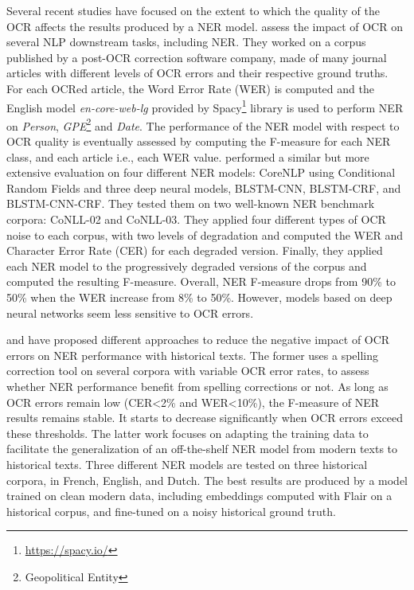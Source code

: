 Several recent studies have focused on the extent to which the quality of the OCR affects the results produced by a NER model.
\cite{van2020assessing} assess the impact of OCR on several NLP downstream tasks, including NER. They worked on a corpus published by a post-OCR correction software company, made of many journal articles with different levels of OCR errors and their respective ground truths.
For each OCRed article, the Word Error Rate (WER) is computed and the English model \textit{en-core-web-lg} provided by Spacy\footnote{\url{https://spacy.io/}} library is used to perform NER on \textit{Person}, \textit{GPE}\footnote{Geopolitical Entity} and \textit{Date}.
The performance of the NER model with respect to OCR quality is eventually assessed by computing the F-measure for each NER class, and each article i.e., each WER value.
\cite{hamdi2020assessing} performed a similar but more extensive evaluation on four different NER models: CoreNLP using Conditional Random Fields and three deep neural models, BLSTM-CNN, BLSTM-CRF, and BLSTM-CNN-CRF.
They tested them on two well-known NER benchmark corpora: CoNLL-02 and CoNLL-03. They applied four different types of OCR noise to each corpus, with two levels of degradation and computed the WER and Character Error Rate (CER) for each degraded version.
Finally, they applied each NER model to the progressively degraded versions of the corpus and computed the resulting F-measure.
Overall, NER F-measure drops from 90\% to 50\% when the WER increase from 8\% to 50\%. However, models based on deep neural networks seem less sensitive to OCR errors.

\cite{huynh2020use} and \cite{marz2021data} have proposed different approaches to reduce the negative impact of OCR errors on NER performance with historical texts.
The former uses a spelling correction tool on several corpora with variable OCR error rates, to assess whether NER performance benefit from spelling corrections or not.
As long as OCR errors remain low (CER<2\% and WER<10\%), the F-measure of NER results remains stable.
It starts to decrease significantly when OCR errors exceed these thresholds.
The latter work focuses on adapting the training data to facilitate the generalization of an off-the-shelf NER model from modern texts to historical texts.
Three different NER models are tested on three historical corpora, in French, English, and Dutch. The best results are produced by a model trained on clean modern data, including embeddings computed with Flair on a historical corpus, and fine-tuned on a noisy historical ground truth.

